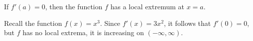 \documentclass{ximera}
\author{Steven Gubkin\and Nela Lakos}
\begin{document}
\begin{exercise}

	If $f'(a) = 0$, then the function $f$ has a local extremum at $x=a$.
	
	\begin{hint}
  Recall the function $f(x)=x^3$. Since $ f'(x)=3x^2$, it follows that $f'(0)=0$, but $f$ has no local extrema, it is increasing on $(-\infty,\infty)$.
\end{hint}

	\begin{multipleChoice}	
	\end{multipleChoice}

\end{exercise}
\end{document}
